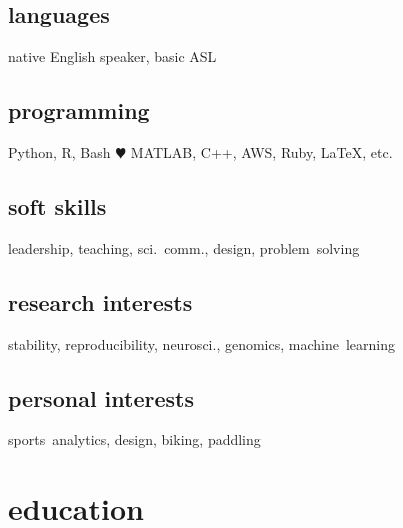 \documentclass[]{friggeri-cv} %
\begin{document}
\begin{aside}
\subsection{languages}
native English speaker,
basic ASL
\subsection{programming}
Python, R, Bash {\color{red} $\varheartsuit$}
MATLAB, C++, AWS,
Ruby, LaTeX, etc.
\subsection{soft skills}
leadership, teaching, sci.~comm., design, problem~solving
\subsection{research interests}
stability, reproducibility, neurosci., genomics, machine~learning
\subsection{personal interests}
sports~analytics, design, biking, paddling
\end{aside}


\section{education}
\end{document}
